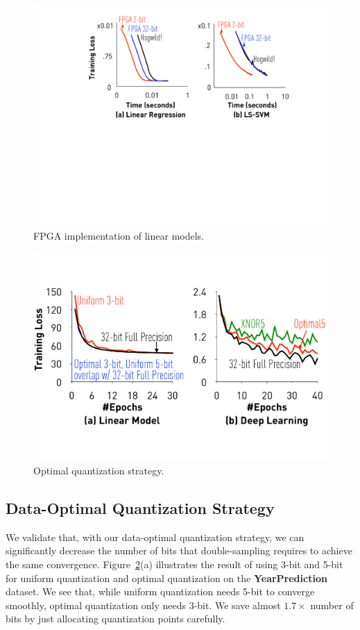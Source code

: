 \documentclass{article}
\begin{document}
\begin{figure}[t]
\centering
\includegraphics[width=0.7\columnwidth]{final-experiments/linear-fpga} 
\vspace{-1em}
\caption{FPGA implementation of linear models.}
\vspace{-1em}
\label{fig:speedup}
\end{figure}

\begin{figure}[t]
\centering
\includegraphics[width=0.7\columnwidth]{final-experiments/optimal} 
\vspace{-1em}
\caption{Optimal quantization strategy.}
\vspace{-1em}
\label{fig:optimal}
\end{figure}

\vspace{-1em}
\subsection{Data-Optimal Quantization Strategy}
\vspace{-0.5em}

We validate that, with our data-optimal quantization strategy, we can 
significantly decrease the number of 
bits that double-sampling requires to 
achieve the same convergence.
Figure~\ref{fig:optimal}(a) illustrates
the result of using 3-bit and 5-bit
for uniform quantization and optimal 
quantization on the {\bf YearPrediction}
dataset. We see that,
while uniform quantization needs 5-bit
to converge smoothly, optimal
quantization only needs 3-bit. 
We save almost $1.7\times$ number of 
bits by just allocating quantization points carefully.
\end{document}
